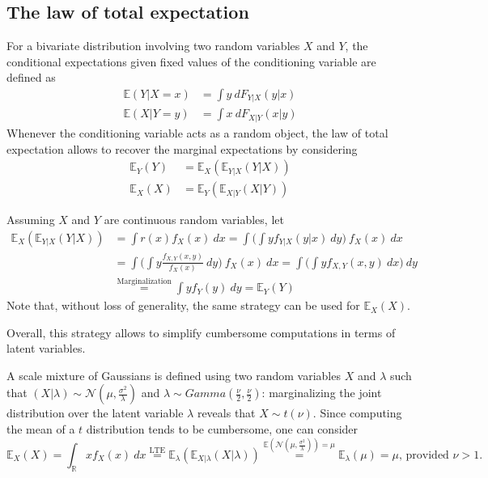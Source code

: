\documentclass{report}
\begin{document}
\subsection{The law of total expectation}
For a bivariate distribution involving two random variables $\displaystyle X$ and $\displaystyle Y$, the conditional expectations given fixed values of the conditioning variable are defined as
\begin{align*}
    \mathbb{E}(Y|X = x) &= \int y \ dF_{Y|X}(y|x) \\
    \mathbb{E}(X|Y = y) &= \int x \ dF_{X|Y}(x|y)
\end{align*}
Whenever the conditioning variable acts as a random object, the law of total expectation allows to recover the marginal expectations by considering
\begin{align*}
    \mathbb{E}_Y(Y) &= \mathbb{E}_X(\mathbb{E}_{Y|X}(Y|X)) \\
    \mathbb{E}_X(X) &= \mathbb{E}_Y(\mathbb{E}_{X|Y}(X|Y))
\end{align*}
\begin{proofbox}
    Assuming $\displaystyle X$ and $\displaystyle Y$ are continuous random variables, let
    \begin{align*}
        \mathbb{E}_X(\mathbb{E}_{Y|X}(Y|X))
            &= \int r(x)f_X(x) \ dx = \int\Bigg(\int yf_{Y|X}(y|x) \ dy\Bigg) \ f_X(x) \ dx \\
            &= \int\Bigg(\int y \frac{f_{X, Y}(x, y)}{f_X(x)} \ dy\Bigg) \ f_X(x) \ dx = \int\Bigg(\int yf_{X, Y}(x, y) \ dx\Bigg) \ dy \\
            &\stackrel{\text{Marginalization}}{=} \int yf_Y(y) \ dy = \mathbb{E}_Y(Y)
    \end{align*}
    Note that, without loss of generality, the same strategy can be used for $\displaystyle \mathbb{E}_X(X)$.
\end{proofbox}
\noindent Overall, this strategy allows to simplify cumbersome computations in terms of latent variables.
\begin{examplebox}
    A scale mixture of Gaussians is defined using two random variables $\displaystyle X$ and $\displaystyle \lambda$ such that $(X|\lambda) \sim \mathcal{N}(\mu, \frac{\sigma^2}{\lambda})$ and $\lambda \sim Gamma(\frac{\nu}{2}, \frac{\nu}{2})$: marginalizing the joint distribution over the latent variable $\displaystyle \lambda$ reveals that $\displaystyle X \sim t(\nu)$. \newline
    Since computing the mean of a $\displaystyle t$ distribution tends to be cumbersome, one can consider
    \[\mathbb{E}_X(X) = \int_{\mathbb{R}} xf_X(x) \ dx \stackrel{\text{LTE}}{=} \mathbb{E}_{\lambda}(\mathbb{E}_{X|\lambda}(X|\lambda)) \stackrel{\mathbb{E}(\mathcal{N}(\mu, \frac{\sigma^2}{\lambda})) = \mu}{=} \mathbb{E}_{\lambda}(\mu) = \mu \text{, provided $\nu > 1$.}\]
\end{examplebox}
\end{document}
